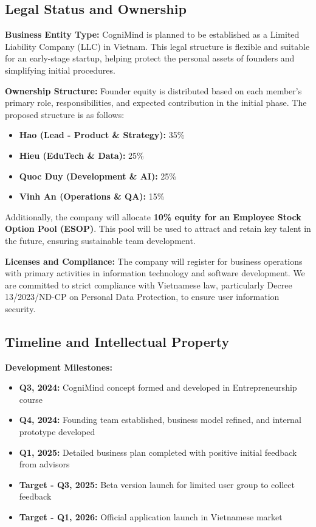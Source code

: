 \subsection{Legal Status and Ownership}

\textbf{Business Entity Type:}
CogniMind is planned to be established as a Limited Liability Company (LLC) in Vietnam. This legal structure is flexible and suitable for an early-stage startup, helping protect the personal assets of founders and simplifying initial procedures.

\textbf{Ownership Structure:}
Founder equity is distributed based on each member's primary role, responsibilities, and expected contribution in the initial phase. The proposed structure is as follows:
\begin{itemize}
    \item \textbf{Hao (Lead - Product \& Strategy):} 35\%
    \item \textbf{Hieu (EduTech \& Data):} 25\%
    \item \textbf{Quoc Duy (Development \& AI):} 25\%
    \item \textbf{Vinh An (Operations \& QA):} 15\%
\end{itemize}

Additionally, the company will allocate \textbf{10\% equity for an Employee Stock Option Pool (ESOP)}. This pool will be used to attract and retain key talent in the future, ensuring sustainable team development.

\textbf{Licenses and Compliance:}
The company will register for business operations with primary activities in information technology and software development. We are committed to strict compliance with Vietnamese law, particularly Decree 13/2023/ND-CP on Personal Data Protection, to ensure user information security.

\subsection{Timeline and Intellectual Property}

\textbf{Development Milestones:}
\begin{itemize}
    \item \textbf{Q3, 2024:} CogniMind concept formed and developed in Entrepreneurship course
    \item \textbf{Q4, 2024:} Founding team established, business model refined, and internal prototype developed
    \item \textbf{Q1, 2025:} Detailed business plan completed with positive initial feedback from advisors
    \item \textbf{Target - Q3, 2025:} Beta version launch for limited user group to collect feedback
    \item \textbf{Target - Q1, 2026:} Official application launch in Vietnamese market
\end{itemize}

